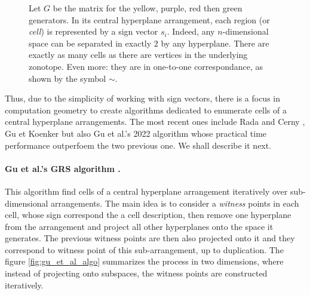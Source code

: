 \begin{figure}[!htb]
\begin{minipage}{0.49\linewidth}
    \end{minipage}
    \caption{Let $G$ be the matrix for the yellow, purple, red then green generators. In its central hyperplane arrangement, each region (or \emph{cell}) is represented by a sign vector $s_i$. Indeed, any $n$-dimensional space can be separated in exactly $2$ by any hyperplane. There are exactly as many cells as there are vertices in the underlying zonotope. Even more: they are in one-to-one correspondance, as shown by the symbol $\sim$.}
    \label{fig:zonotope_hyperplane_arrangement2}
\end{figure}

Thus, due to the simplicity of working with sign vectors, there is a focus in computation geometry to create algorithms dedicated to enumerate cells of a central hyperplane arrangements. The most recent ones include Rada and Cerny \cite{radaNewAlgorithmEnumeration2018}, Gu et Koenker \cite{guNonparametricMaximumLikelihood2020} but also Gu et al.'s 2022 algorithm \cite{guCounterfactualIdentificationLatent2022} whose practical time performance outperfoem the two previous one. We shall describe it next.

\paragraph*{Gu et al.'s GRS algorithm \cite{guCounterfactualIdentificationLatent2022}.}
This algorithm find cells of a central hyperplane arrangement iteratively over sub-dimensional arrangements. The main idea is to consider a \emph{witness} points in each cell, whose sign correspond the a cell description, then remove one hyperplane from the arrangement and project all other hyperplanes onto the space it generates. The previous witness points are then also projected onto it and they correspond to witness point of this sub-arrangement, up to duplication.
The figure \ref{fig:gu_et_al_algo} summarizes the process in two dimensions, where instead of projecting onto subspaces, the witness points are constructed iteratively.


